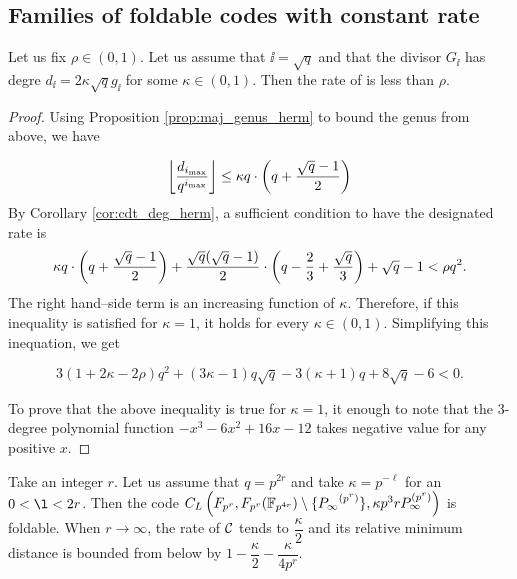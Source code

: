 \documentclass[10pt]{article}
\begin{document}
\newpage


\subsection{Families of foldable codes with constant rate}


\begin{proposition}
	Let us fix $\rho \in (0,1)$. Let us assume that $\ii =\sqrt{q}$ and that the divisor $G_{\ii}$ has degre $d_{\ii} = 2\kappa \sqrt{q}g_{\ii}$ for some $\kappa \in (0,1)$.
	Then the rate of  is less than $\rho$.
\end{proposition}
\begin{proof}
	Using Proposition \ref{prop:maj_genus_herm} to bound the genus from above, we have
	
	\[ \left\lfloor\dfrac{d_{i_{\rm{max}}}}{q^{i_{\rm{max}}}}\right\rfloor \leq  \kappa q \cdot \left( q + \dfrac{\sqrt{q}-1}{2} \right)\]
	By Corollary \ref{cor:cdt_deg_herm}, a sufficient condition to have the designated rate is 
	\[\kappa q\cdot \left( q + \dfrac{\sqrt{q}-1}{2} \right)+\dfrac{\sqrt{q}(\sqrt{q}-1)}{2}\cdot \left(q-\frac{2}{3} + \frac{\sqrt{q}}{3}\right) + \sqrt{q}-1 < \rho q^2.\]
	The right hand--side term is an increasing function of $\kappa$. Therefore, if this inequality is satisfied for $\kappa=1$, it holds for every $\kappa \in (0,1)$. Simplifying this inequation, we get
		 
	
	\[3(1+2\kappa - 2\rho) q^2 + (3\kappa-1)q\sqrt{q}-3(\kappa+1)q+8\sqrt{q}-6 <0.\]
	
	
	To prove that the above inequality is true for $\kappa=1$, it enough to note that the 3-degree polynomial function $-x^3-6x^2+16x-12$ takes negative value for any positive $x$.
\end{proof}


Take an integer $r$. Let us assume that $q=p^{2r}$ and take $\kappa=p^{-\ell}$ for an $0<\l<2r$. Then the code $C_L\left(F_{p^r},F_{p^r}( \mathbb{F}_{p^{4r}} )\setminus\{ {P_\infty}^{(p^r)} \}, \kappa p^3rP_\infty^{(p^r)}\right)$ is foldable. When $r \rightarrow \infty$, the rate of $\mathcal{C}$ tends to $\dfrac{\kappa}{2}$ and its relative minimum distance is bounded from below by $1-\dfrac{\kappa}{2}-\dfrac{\kappa}{4p^r}$.
\end{document}
